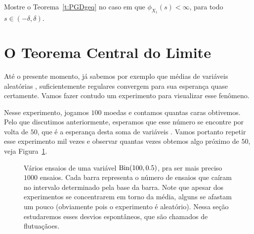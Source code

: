 \begin{exercise}
  Mostre o Teorema~\ref{t:PGDgeq} no caso em que $\phi_{X_1}(s) < \infty$, para todo $s \in (-\delta, \delta)$.
\end{exercise}

\newpage

\section{O Teorema Central do Limite}

Até o presente momento, já sabemos por exemplo que médias de variáveis aleatórias \iid, suficientemente regulares convergem para sua esperança quase certamente.
Vamos fazer contudo um experimento para visualizar esse fenômeno.

Nesse experimento, jogamos $100$ moedas e contamos quantas caras obtivemos.
Pelo que discutimos anteriormente, esperamos que esse número se encontre por volta de $50$, que é a esperança desta soma de variáveis \iid.
Vamos portanto repetir esse experimento mil vezes e observar quantas vezes obtemos algo próximo de $50$, veja Figura~\ref{f:histograma_normal}.

\begin{figure}[!ht]
  \centering
  \caption{Vários ensaios de uma variável $\operatorname{Bin}(100,0.5)$, pra ser mais preciso $1000$ ensaios. Cada barra representa o número de ensaios que caíram no intervalo determinado pela base da barra. Note que apesar dos experimentos se concentrarem em torno da média, alguns se afastam um pouco (obviamente pois o experimento é aleatório). Nessa seção estudaremos esses desvios espontâneos, que são chamados de flutuaçãoes. }
  \label{f:histograma_normal}
\end{figure}

